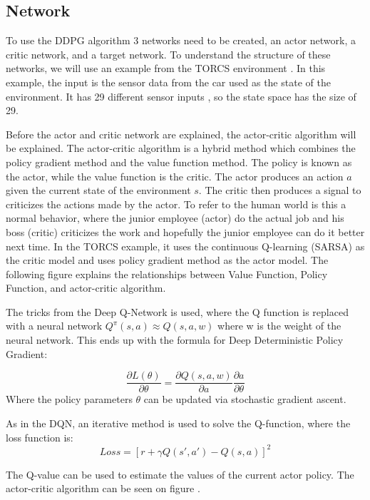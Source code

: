 \subsection{Network}
To use the DDPG algorithm 3 networks need to be created, an actor network, a critic network, and a target network. To understand the structure of these networks, we will use an example from the TORCS environment \cite{DDPG_Torcs}. In this example, the input is the sensor data from the car used as the state of the environment. It has 29 different sensor inputs \cite{Data_from_Torcs}, so the state space has the size of 29.  

Before the actor and critic network are explained, the actor-critic algorithm will be explained. The actor-critic algorithm is a hybrid method which combines the policy gradient method and the value function method. The policy is known as the actor, while the value function is the critic. The actor produces an action $a$ given the current state of the environment $s$. The critic then produces a signal to criticizes the actions made by the actor. To refer to the human world is this a normal behavior, where the junior employee (actor) do the actual job and his boss (critic) criticizes the work and hopefully the junior employee can do it better next time. In the TORCS example, it uses the continuous Q-learning (SARSA) as the critic model and uses policy gradient method as the actor model. The following figure explains the relationships between Value Function, Policy Function, and actor-critic algorithm.    

The tricks from the Deep Q-Network is used, where the Q function is replaced with a neural network $Q^\pi(s,a) \approx Q(s,a,w)$ where w is the weight of the neural network. This ends up with the formula for Deep Deterministic Policy Gradient:
 
\begin{equation}
\frac{\partial L(\theta)}{\partial \theta} =\frac{\partial Q(s,a,w)}{\partial a} \frac{\partial a}{\partial \theta}
\end{equation}
Where the policy parameters $\theta$ can be updated via stochastic gradient ascent.

As in the DQN, an iterative method is used to solve the Q-function, where the loss function is:
\begin{equation}
Loss = [r + \gamma Q(s',a') - Q(s,a)]^2
\end{equation} 

The Q-value can be used to estimate the values of the current actor policy. The actor-critic algorithm can be seen on figure . 

